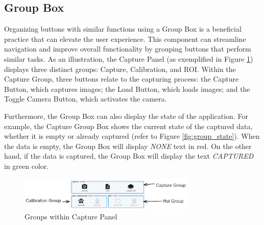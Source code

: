 \subsection{Group Box}

Organizing buttons with similar functions using a Group Box is a beneficial practice that can elevate the user experience. This component can streamline navigation and improve overall functionality by grouping buttons that perform similar tasks. As an illustration, the Capture Panel (as exemplified in Figure \ref{fig:group_example}) displays three distinct groups: Capture, Calibration, and ROI. Within the Capture Group, three buttons relate to the capturing process: the Capture Button, which captures images; the Load Button, which loads images; and the Toggle Camera Button, which activates the camera.

Furthermore, the Group Box can also display the state of the application. For example, the Capture Group Box shows the current state of the captured data, whether it is empty or already captured (refer to Figure \ref{fig:group_state}). When the data is empty, the Group Box will display \textit{NONE} text in red. On the other hand, if the data is captured, the Group Box will display the text \textit{CAPTURED} in green color.

\begin{figure}[!ht]
    \centering
    \includegraphics[width=0.75\textwidth]{texs/Part2/chapter4/image/groupexample.png}
    \caption{Groups within Capture Panel}
    \label{fig:group_example}
\end{figure}

